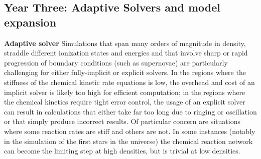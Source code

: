 

\subsection{Year Three: Adaptive Solvers and model expansion}

\noindent \textbf{Adaptive solver}
Simulations that span many orders of magnitude in density, straddle different
ionization states and energies and that involve sharp or rapid progression of
boundary conditions (such as supernovae) are particularly challenging for
either fully-implicit or explicit solvers.  In the regions where the stiffness
of the chemical kinetic rate equations is low, the overhead and cost of an
implicit solver is likely too high for efficient computation; in the regions
where the chemical kinetics require tight error control, the usage of an
explicit solver can result in calculations that either take far too long due to
ringing or oscillation or that simply produce incorrect results.  Of particular
concern are situations where some reaction rates are stiff and others are not.
In some instances (notably in the simulation of the first stars in the
universe) the chemical reaction network can become the limiting step at high
densities, but is trivial at low densities.

